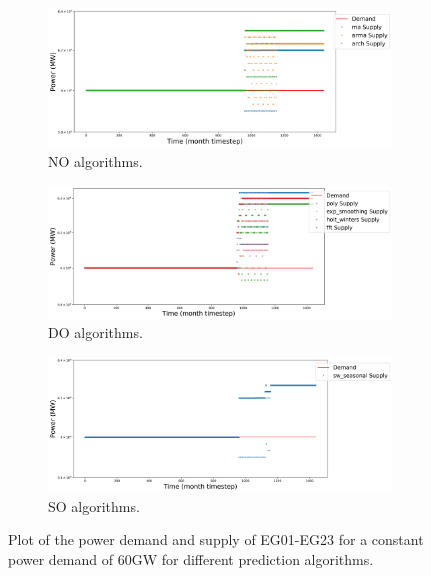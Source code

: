 \documentclass[11pt]{article}
\begin{document}
\begin{figure}[!htbp]
	\centering
	\begin{subfigure}[t]{.95\textwidth}
		\centering
		\includegraphics[width=\linewidth]{23-power-bufferB20001.png} 
		\caption{NO algorithms.}
		\label{fig:23powerNO}
	\end{subfigure}
	\vspace{.9cm}
	\begin{subfigure}[t]{.95\textwidth}
		\centering
		\includegraphics[width=\linewidth]{23-power-bufferB20002.png} 
		\caption{DO algorithms.}
		\label{fig:23powerDO}
	\end{subfigure}
	\vspace{.1cm}
	\begin{subfigure}[t]{.95\textwidth}
		\centering
		\includegraphics[width=\linewidth]{23-power-bufferB20003.png} 
		\caption{SO algorithms.}
		\label{fig:23powerSO}
	\end{subfigure}
	\hfill
	\caption{Plot of the power demand and supply of EG01-EG23 for a constant power demand of 60GW for different prediction algorithms.}
	\label{fig:23power}
\end{figure}
\end{document}
